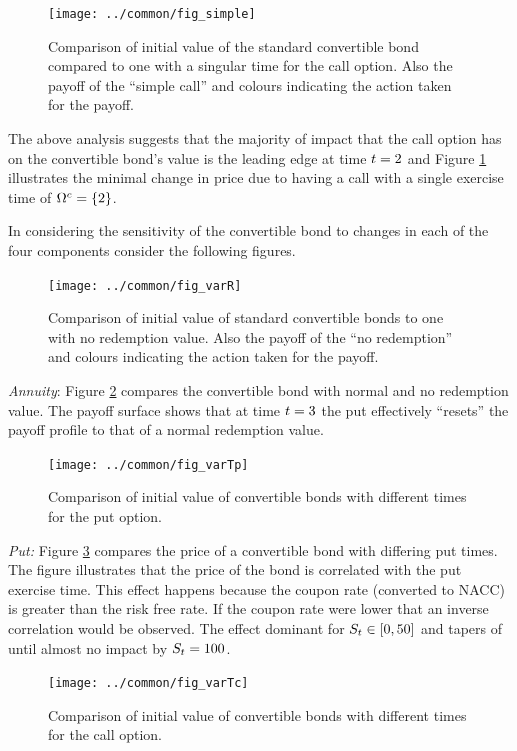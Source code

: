 \documentclass[a4paper,11pt,oneside]{report}
\theoremstyle{plain}
\theoremstyle{definition}
\begin{document}
\begin{figure}[htb!]
 \centering
 \texttt{[image: ../common/fig\_simple]}
 \caption[Simple Call]{Comparison of initial value of the standard convertible bond compared to one with a singular time for the call option.  Also the payoff of the ``simple call'' and colours indicating the action taken for the payoff.}
 \label{fig:simple}
\end{figure}\FloatBarrier

The above analysis suggests that the majority of impact that the call option has on the convertible bond's value is the leading edge at time $\t = 2$ and Figure \ref{fig:simple} illustrates the minimal change in price due to having a call with a single exercise time of $\Tc = \{2\}$.

In considering the sensitivity of the convertible bond to changes in each of the four components consider the following figures.

\begin{figure}[htb!]
 \centering
 \texttt{[image: ../common/fig\_varR]}
 \caption[Varying Redemption Value]{Comparison of initial value of standard convertible bonds to one with no redemption value.  Also the payoff of the ``no redemption'' and colours indicating the action taken for the payoff.}
 \label{fig:varR}
\end{figure}

\emph{Annuity}: Figure \ref{fig:varR} compares the convertible bond with normal and no redemption value.  The payoff surface shows that at time $\t = 3$ the put effectively ``resets'' the payoff profile to that of a normal redemption value.

\begin{figure}[htb!]
 \centering
 \texttt{[image: ../common/fig\_varTp]}
 \caption[Varying Put Time]{Comparison of initial value of convertible bonds with different times for the put option.}
 \label{fig:varTp}
\end{figure}

\emph{Put:} Figure \ref{fig:varTp} compares the price of a convertible bond with differing put times.  The figure illustrates that the price of the bond is correlated with the put exercise time.  This effect happens because the coupon rate (converted to NACC) is greater than the risk free rate.  If the coupon rate were lower that an inverse correlation would be observed.  The effect dominant for $\S \in [0, 50]$ and tapers of until almost no impact by $\S = 100$.

\begin{figure}[htb!]
 \centering
 \texttt{[image: ../common/fig\_varTc]}
 \caption[Varying Call Time]{Comparison of initial value of convertible bonds with different times for the call option.}
 \label{fig:varTc}
\end{figure}
\end{document}
